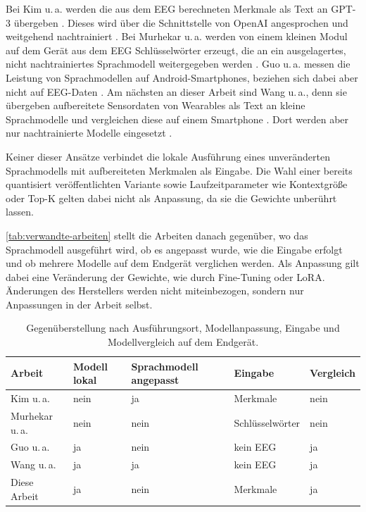 \noindent Bei Kim u.\,a. werden die aus dem \ac{EEG} berechneten Merkmale als Text an GPT-3 übergeben \autocite{eeg_gpt2024}. Dieses wird über die Schnittstelle von OpenAI angesprochen und weitgehend nachtrainiert \autocite{eeg_gpt2024}. Bei Murhekar u.\,a. werden von einem kleinen Modul auf dem Gerät aus dem \ac{EEG} Schlüsselwörter erzeugt, die an ein ausgelagertes, nicht nachtrainiertes Sprachmodell weitergegeben werden \autocite{sense2026}. Guo u.\,a. messen die Leistung von Sprachmodellen auf Android-Smartphones, beziehen sich dabei aber nicht auf \ac{EEG}-Daten \autocite{guo2025llm}. Am nächsten an dieser Arbeit sind Wang u.\,a., denn sie übergeben aufbereitete Sensordaten von Wearables als Text an kleine Sprachmodelle und vergleichen diese auf einem Smartphone \autocite{healthslm_bench2025}. Dort werden aber nur nachtrainierte Modelle eingesetzt \autocite{healthslm_bench2025}.
\vspace{\baselineskip}

\noindent Keiner dieser Ansätze verbindet die lokale Ausführung eines unveränderten Sprachmodells mit aufbereiteten Merkmalen als Eingabe. Die Wahl einer bereits quantisiert veröffentlichten Variante sowie Laufzeitparameter wie Kontextgröße oder Top-K gelten dabei nicht als Anpassung, da sie die Gewichte unberührt lassen.
\vspace{\baselineskip}

\noindent \autoref{tab:verwandte-arbeiten} stellt die Arbeiten danach gegenüber, wo das Sprachmodell ausgeführt wird, ob es angepasst wurde, wie die Eingabe erfolgt und ob mehrere Modelle auf dem Endgerät verglichen werden. Als Anpassung gilt dabei eine Veränderung der Gewichte, wie durch Fine-Tuning oder \ac{LoRA}. Änderungen des Herstellers werden nicht miteinbezogen, sondern nur Anpassungen in der Arbeit selbst.
\begin{table}[H]
    \centering
    \caption[Einordnung gegenüber verwandten Arbeiten]{Gegenüberstellung nach Ausführungsort, Modellanpassung, Eingabe und Modellvergleich auf dem Endgerät.}
    \label{tab:verwandte-arbeiten}
    \small
    \begin{tabularx}{\textwidth}{X l l l l}
        \toprule
        \textbf{Arbeit} & \textbf{Modell lokal} & \textbf{Sprachmodell angepasst} & \textbf{Eingabe} & \textbf{Vergleich} \\
        \midrule
        Kim u.\,a. \autocite{eeg_gpt2024}                 & nein & ja   & Merkmale        & nein \\
        Murhekar u.\,a. \autocite{sense2026}              & nein & nein & Schlüsselwörter & nein \\
        Guo u.\,a. \autocite{guo2025llm}                  & ja   & nein & kein \ac{EEG}   & ja \\
        Wang u.\,a. \autocite{healthslm_bench2025}        & ja   & ja   & kein \ac{EEG}   & ja \\
        \midrule
        Diese Arbeit                                      & ja   & nein & Merkmale        & ja \\
        \bottomrule
    \end{tabularx}
\end{table}

